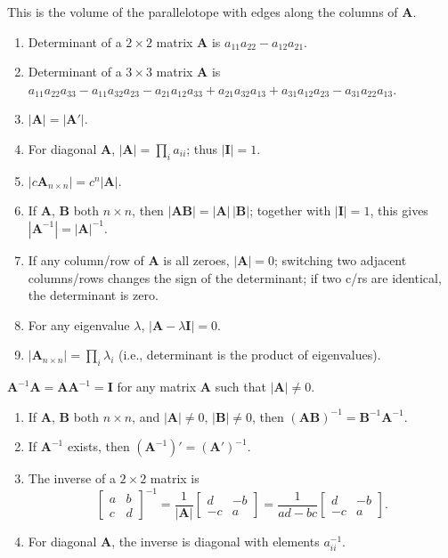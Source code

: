 \documentclass[8pt,letterpaper, landscape]{extarticle} %
\newcommand{\mA}{\ensuremath{\mathbf{A}}}
\newcommand{\mB}{\ensuremath{\mathbf{B}}}
\newcommand{\mI}{\ensuremath{\mathbf{I}}}
\begin{document}
\begin{multicols}{3}
\begin{description}
This is the volume of the parallelotope with edges along the columns of $ \mA $.
\begin{enumerate}
\item Determinant of a $ 2 \times 2 $ matrix $ \mA $ is $ a_{11} a_{22} - a_{12} a_{21} $.
\item Determinant of a $ 3 \times 3 $ matrix $ \mA $ is $
  a_{11} a_{22} a_{33}
- a_{11} a_{32} a_{23}
- a_{21} a_{12} a_{33}
+ a_{21} a_{32} a_{13}
+ a_{31} a_{12} a_{23}
- a_{31} a_{22} a_{13}
$.
\item $ | \mA | = | \mA' | $.
\item For diagonal $ \mA $, $ | \mA | = \prod_i a_{ii} $; thus $ | \mI | = 1 $.
\item $ | c \mA_{n \times n} | = c^n | \mA | $.
\item If $ \mA $, $ \mB $ both $ n \times n $, then $ | \mA \mB | = | \mA | \, | \mB | $; together with $ | \mI | = 1 $, this gives $ | \mA^{-1} | = | \mA |^{-1} $.
\item If any column/row of $ \mA $ is all zeroes, $ | \mA | = 0 $; switching two adjacent columns/rows changes the sign of the determinant; if two c/rs are identical, the determinant is zero.
\item For any eigenvalue $ \lambda $, $ | \mA - \lambda \mI | = 0 $.
\item $ | \mA_{n \times n} | = \prod_i \lambda_i $ (i.e., determinant is the product of eigenvalues).
\end{enumerate}

 $ \mA^{-1}\mA = \mA \mA^{-1} = \mI $ for any matrix $ \mA $ such that $ | \mA | \neq 0 $.
\begin{enumerate}
\item If $ \mA $, $ \mB $ both $ n \times n $, and $ | \mA | \neq 0 $, $ | \mB | \neq 0 $, then $ (\mA \mB)^{-1} = \mB^{-1} \mA^{-1} $.
\item If $ \mA^{-1} $ exists, then $ (\mA^{-1})' = (\mA')^{-1} $.
\item The inverse of a $ 2 \times 2 $ matrix is
$$ \begin{bmatrix}
a & b \\
c & d
\end{bmatrix}^{-1} =
\frac{1}{| \mA |}
\begin{bmatrix}
d & -b \\
-c & a
\end{bmatrix}
=
\frac{1}{ad - bc}
\begin{bmatrix}
d & -b \\
-c & a
\end{bmatrix} . $$
\item For diagonal $ \mA $, the inverse is diagonal with elements $ a_{ii}^{-1} $.
\end{enumerate}


\end{description}
\end{multicols}
\end{document}
